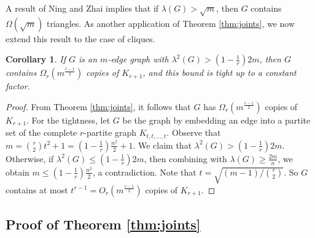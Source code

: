 \documentclass[11pt,a4paper]{article}
\newtheorem{cor}[theorem]{Corollary}
\theoremstyle{definition}
\theoremstyle{remark}
\begin{document}
A result of Ning and Zhai \cite{NZ2021} implies that 
if $\lambda (G)> \sqrt{m}$, then $G$ contains 
$\Omega (\sqrt{m})$ triangles. 
As another application of Theorem \ref{thm:joints}, 
we now extend this result to the case of cliques. 

\begin{cor} \label{cor-extend-triangle}
If $G$ is an $m$-edge graph with $\lambda^2 (G)> (1-\frac{1}{r})2m$, then 
$G$ contains $\Omega_r (m^{\frac{r-1}{2}})$ 
copies of $K_{r+1}$, and this bound is tight up to a constant factor. 
\end{cor}

\begin{proof}
    From Theorem \ref{thm:joints}, it follows that $G$ has $\Omega_r (m^{\frac{r-1}{2}})$ copies of $K_{r+1}$. For the tightness, let $G$ be the graph by embedding an edge into a partite set of the complete $r$-partite graph $K_{t,t,\ldots,t}$. 
    Observe that $m={r \choose 2}t^2+1=(1-\frac{1}{r})\frac{n^2}{2}+1$. 
    We claim that $\lambda^2 (G) >(1- \frac{1}{r})2m $. Otherwise, if $\lambda^2(G) \le {(1-\frac{1}{r})2m}$, then combining with $\lambda (G)\ge \frac{2m}{n}$, we obtain $m\le (1-\frac{1}{r})\frac{n^2}{2}$, a contradiction. 
    Note that $t=\sqrt{(m-1)/{r\choose 2}}$. So $G$ contains at most $t^{r-1}=O_r(m^{\frac{r-1}{2}})$ copies of $K_{r+1}$. 
\end{proof}


\subsection{Proof of Theorem \ref{thm:joints}}
\end{document}
